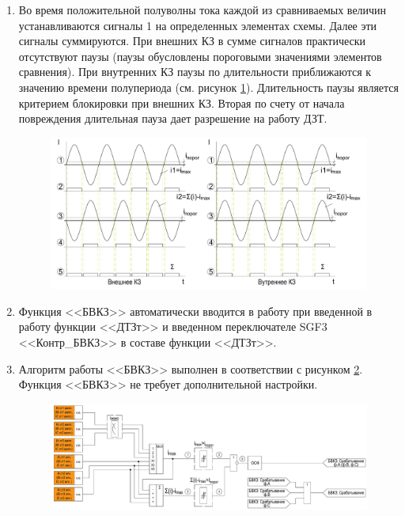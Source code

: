\documentclass[a4paper, 12pt,table, hidelinks, DIV=calc]{extarticle} %
\begin{document}
\begin{enumerate}[label=\arabic{section}.\arabic{subsection}.\arabic{enumi}, labelsep=4pt, leftmargin=0pt, itemindent=57pt, itemsep=0pt, parsep=5pt]
\begin{enumerate}[label=\arabic{section}.\arabic{subsection}.\arabic{enumi}.\arabic*, labelsep=4pt, leftmargin=0em, itemindent=65pt, parsep=0pt]
\item
Во время положительной полуволны тока каждой из сравниваемых величин устанавливаются сигналы 1 на определенных элементах схемы. Далее эти сигналы суммируются. При внешних КЗ в сумме сигналов практически отсутствуют паузы (паузы обусловлены пороговыми значениями элементов сравнения). При внутренних КЗ паузы по длительности приближаются к значению времени полупериода (см. рисунок \ref{dzt:imgcharbvkz}). Длительность паузы является критерием блокировки при внешних КЗ. Вторая по счету от начала повреждения длительная пауза дает разрешение на работу ДЗТ.

\vspace{1mm}
\begin{figure}[H]
\centering
\includegraphics[width=1\textwidth,height=1\textheight,keepaspectratio]{img9.pdf}
\label{dzt:imgcharbvkz}
\end{figure}

\item
Функция <<БВКЗ>> автоматически вводится в работу при введенной в работу функции <<ДТЗт>> и введенном переключателе SGF3 <<Контр\_БВКЗ>> в составе функции <<ДТЗт>>.

\item
Алгоритм работы <<БВКЗ>> выполнен в соответствии с рисунком \ref{dzt:imgbvkz}. Функция <<БВКЗ>> не требует дополнительной настройки.

\vspace{1mm}
\begin{figure}[H]
\includegraphics[width=\textwidth,height=\textheight,keepaspectratio]{img10.pdf}
\label{dzt:imgbvkz}
\end{figure}


\end{enumerate}
\end{enumerate}
\end{document}

